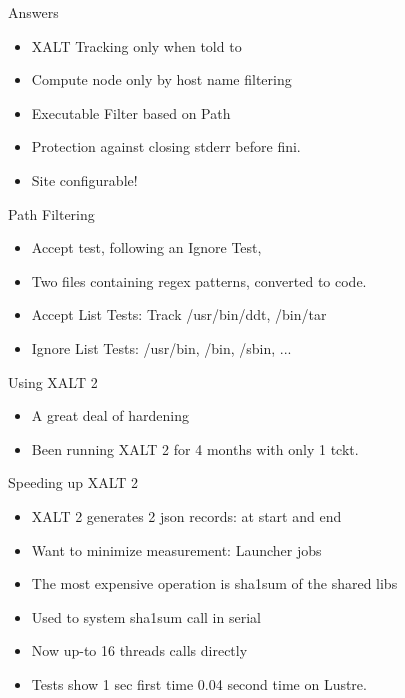 \documentclass{beamer}
\begin{document}
\begin{frame}{Answers}
  \begin{itemize}
    \item XALT Tracking only when told to
    \item Compute node only by host name filtering
    \item Executable Filter based on Path
    \item Protection against closing stderr before fini.
    \item Site configurable!
  \end{itemize}
\end{frame}

\begin{frame}{Path Filtering}
  \begin{itemize}
    \item Accept test, following an Ignore Test,
    \item Two files containing regex patterns, converted to code.
    \item Accept List Tests: Track /usr/bin/ddt, /bin/tar
    \item Ignore List Tests: /usr/bin, /bin, /sbin, ...
  \end{itemize}
\end{frame}

\begin{frame}{Using XALT 2}
  \begin{itemize}
    \item A great deal of hardening 
    \item Been running XALT 2 for 4 months with only 1 tckt.
  \end{itemize}
\end{frame}

\begin{frame}{Speeding up XALT 2}
  \begin{itemize}
    \item XALT 2 generates 2 json records: at start and end
    \item Want to minimize measurement: Launcher jobs
    \item The most expensive operation is sha1sum of the shared libs
    \item Used to system sha1sum call in serial
    \item Now up-to 16 threads calls directly
    \item Tests show 1 sec first time 0.04 second time on Lustre.
  \end{itemize}
\end{frame}
\end{document}
